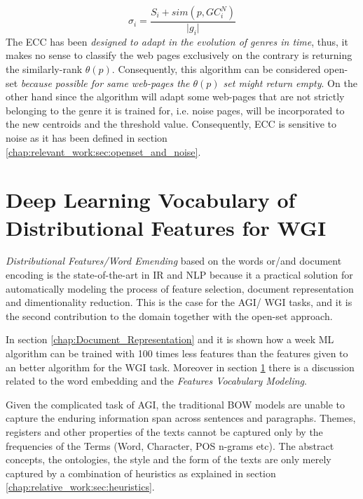 \begin{equation}\label{eq:jebary_ecc_new_thres}
	\sigma_{i} = \frac{S_{i} +  sim(p, GC_{i}^{N})}{\vert g_{i} \vert}
\end{equation}
The ECC has been \textit{designed to adapt in the evolution of genres in time}, thus, it makes no sense to classify the web pages exclusively on the contrary is returning the similarly-rank $\theta(p)$. Consequently, this algorithm can be considered open-set \textit{because possible for same web-pages the  $\theta(p)$ set might return empty}. On the other hand since the algorithm will adapt some web-pages that are not strictly belonging to the genre it is trained for, i.e. noise pages, will be incorporated to the new centroids and the threshold value.  Consequently, ECC is sensitive to noise as it has been defined in section \ref{chap:relevant_work:sec:openset_and_noise}.



\section{Deep Learning Vocabulary of Distributional Features for WGI}\label{chap:relevant_work:sec:word_embedding}

\textit{Distributional Features/Word Emending} based on the words or/and document encoding is the state-of-the-art in IR and NLP because it a practical solution for automatically modeling the process of feature selection, document representation and dimentionality reduction. This is the case for the AGI/ WGI tasks, and it is the second contribution to the domain together with the open-set approach.

In section \ref{chap:Document_Representation} and it is shown how a week ML algorithm can be trained with 100 times less features than the features given to an better algorithm for the WGI task. Moreover in section \ref{chap:relevant_work:sec:word_embedding} there is a discussion related to the word embedding and the \textit{Features Vocabulary Modeling}.


Given the complicated task of AGI, the traditional BOW models are unable to capture the enduring information span across sentences and paragraphs. Themes, registers and other properties of the texts cannot be captured only by the frequencies of the Terms (Word, Character, POS n-grams etc). The abstract concepts, the ontologies, the style and the form of the texts are only merely captured by a combination of heuristics as explained in section \ref{chap:relative_work:sec:heuristics}. 

